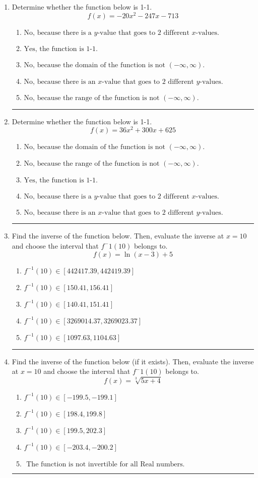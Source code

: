\documentclass[14pt]{extbook}
\newcommand{\litem}[1]{\item#1\hspace*{-1cm}\rule{\textwidth}{0.4pt}}
\begin{document}
\begin{enumerate}
{\begin{enumerate}[label=\Alph*.]
\end{enumerate} }
\litem{
Determine whether the function below is 1-1.\[ f(x) = -20 x^2 - 247 x - 713 \]\begin{enumerate}[label=\Alph*.]
\item \( \text{No, because there is a $y$-value that goes to 2 different $x$-values.} \)
\item \( \text{Yes, the function is 1-1.} \)
\item \( \text{No, because the domain of the function is not $(-\infty, \infty)$.} \)
\item \( \text{No, because there is an $x$-value that goes to 2 different $y$-values.} \)
\item \( \text{No, because the range of the function is not $(-\infty, \infty)$.} \)

\end{enumerate} }
\litem{
Determine whether the function below is 1-1.\[ f(x) = 36 x^2 + 300 x + 625 \]\begin{enumerate}[label=\Alph*.]
\item \( \text{No, because the domain of the function is not $(-\infty, \infty)$.} \)
\item \( \text{No, because the range of the function is not $(-\infty, \infty)$.} \)
\item \( \text{Yes, the function is 1-1.} \)
\item \( \text{No, because there is a $y$-value that goes to 2 different $x$-values.} \)
\item \( \text{No, because there is an $x$-value that goes to 2 different $y$-values.} \)

\end{enumerate} }
\litem{
Find the inverse of the function below. Then, evaluate the inverse at $x = 10$ and choose the interval that $f^-1(10)$ belongs to.\[ f(x) = \ln{(x-3)}+5 \]\begin{enumerate}[label=\Alph*.]
\item \( f^{-1}(10) \in [442417.39, 442419.39] \)
\item \( f^{-1}(10) \in [150.41, 156.41] \)
\item \( f^{-1}(10) \in [140.41, 151.41] \)
\item \( f^{-1}(10) \in [3269014.37, 3269023.37] \)
\item \( f^{-1}(10) \in [1097.63, 1104.63] \)

\end{enumerate} }
\litem{
Find the inverse of the function below (if it exists). Then, evaluate the inverse at $x = 10$ and choose the interval that $f^-1(10)$ belongs to.\[ f(x) = \sqrt[3]{5 x + 4} \]\begin{enumerate}[label=\Alph*.]
\item \( f^{-1}(10) \in [-199.5, -199.1] \)
\item \( f^{-1}(10) \in [198.4, 199.8] \)
\item \( f^{-1}(10) \in [199.5, 202.3] \)
\item \( f^{-1}(10) \in [-203.4, -200.2] \)
\item \( \text{ The function is not invertible for all Real numbers. } \)


\end{enumerate}}
\end{enumerate}
\end{document}
